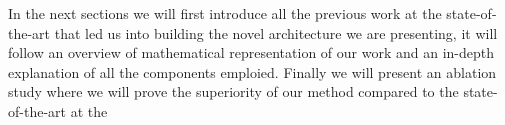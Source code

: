 In the next sections we will first introduce all the previous work at the state-of-the-art that led us into building the novel architecture we are presenting, it will follow an overview of mathematical representation of our work and an in-depth explanation of all the components emploied. 
Finally we will present an ablation study where we will prove the superiority of our method compared to the state-of-the-art at the